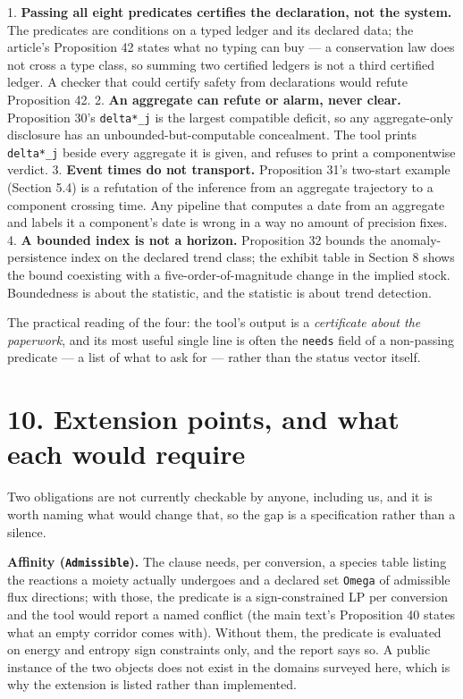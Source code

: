 \documentclass[11pt]{article}
\begin{document}
1. \textbf{Passing all eight predicates certifies the declaration, not the system.} The predicates are conditions on a typed ledger and its declared data; the article's Proposition 42 states what no typing can buy --- a conservation law does not cross a type class, so summing two certified ledgers is not a third certified ledger. A checker that could certify safety from declarations would refute Proposition 42. 2. \textbf{An aggregate can refute or alarm, never clear.} Proposition 30's \texttt{delta*\_j} is the largest compatible deficit, so any aggregate-only disclosure has an unbounded-but-computable concealment. The tool prints \texttt{delta*\_j} beside every aggregate it is given, and refuses to print a componentwise verdict. 3. \textbf{Event times do not transport.} Proposition 31's two-start example (Section 5.4) is a refutation of the inference from an aggregate trajectory to a component crossing time. Any pipeline that computes a date from an aggregate and labels it a component's date is wrong in a way no amount of precision fixes. 4. \textbf{A bounded index is not a horizon.} Proposition 32 bounds the anomaly-persistence index on the declared trend class; the exhibit table in Section 8 shows the bound coexisting with a five-order-of-magnitude change in the implied stock. Boundedness is about the statistic, and the statistic is about trend detection.

The practical reading of the four: the tool's output is a \emph{certificate about the paperwork}, and its most useful single line is often the \texttt{needs} field of a non-passing predicate --- a list of what to ask for --- rather than the status vector itself.

\vspace{0.8em}

\section*{10. Extension points, and what each would require}\label{10-extension-points-and-what-each-would-require}

Two obligations are not currently checkable by anyone, including us, and it is worth naming what would change that, so the gap is a specification rather than a silence.

\textbf{Affinity (\texttt{Admissible}).} The clause needs, per conversion, a species table listing the reactions a moiety actually undergoes and a declared set \texttt{Omega} of admissible flux directions; with those, the predicate is a sign-constrained LP per conversion and the tool would report a named conflict (the main text's Proposition 40 states what an empty corridor comes with). Without them, the predicate is evaluated on energy and entropy sign constraints only, and the report says so. A public instance of the two objects does not exist in the domains surveyed here, which is why the extension is listed rather than implemented.
\end{document}
